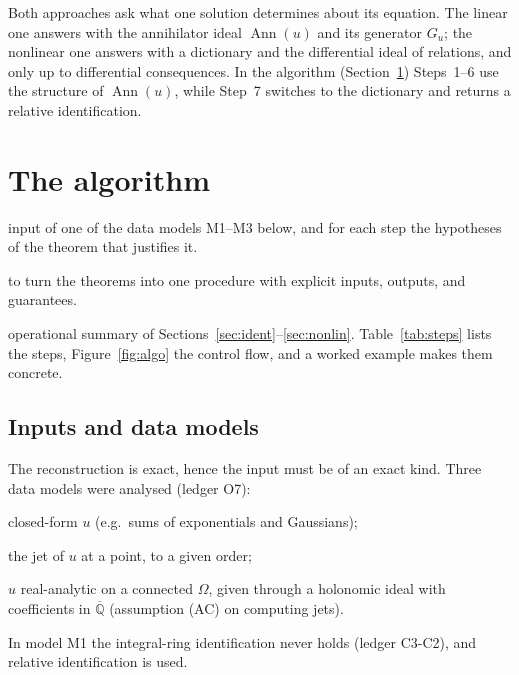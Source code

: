 \documentclass[11pt,a4paper]{article}
\theoremstyle{definition}
\newcommand{\led}[1]{\textcolor{cG}{\textsf{\footnotesize(ledger #1)}}}
\newcommand{\sectionbrief}[3]{\begin{leadin}\begin{description}[nosep,leftmargin=3.0cm,labelwidth=2.8cm]
  \item[Starting from] #1
  \item[Why this section] #2
  \item[Role in the paper] #3
  \end{description}\end{leadin}}
\newcommand{\Ann}{\operatorname{Ann}}
\begin{document}
\begin{keypoint}
Both approaches ask what one solution determines about its equation. The linear one answers with the annihilator ideal $\Ann(u)$ and its generator $G_u$; the nonlinear one answers with a dictionary and the differential ideal of relations, and only up to differential consequences. In the algorithm (Section~\ref{sec:algo}) Steps~1--6 use the structure of $\Ann(u)$, while Step~7 switches to the dictionary and returns a relative identification.
\end{keypoint}

\section{The algorithm}\label{sec:algo}
\sectionbrief
{input of one of the data models M1--M3 below, and for each step the hypotheses of the theorem that justifies it.}
{to turn the theorems into one procedure with explicit inputs, outputs, and guarantees.}
{operational summary of Sections~\ref{sec:ident}--\ref{sec:nonlin}. Table~\ref{tab:steps} lists the steps, Figure~\ref{fig:algo} the control flow, and a worked example makes them concrete.}

\subsection{Inputs and data models}
The reconstruction is exact, hence the input must be of an exact kind. Three data models were analysed \led{O7}:
\begin{description}[nosep,leftmargin=2.2cm,labelwidth=2cm]
\item[M1] closed-form $u$ (e.g.\ sums of exponentials and Gaussians);
\item[M2] the jet of $u$ at a point, to a given order;
\item[M3] $u$ real-analytic on a connected $\Omega$, given through a holonomic ideal with coefficients in $\overline{\mathbb Q}$ (assumption (AC) on computing jets).
\end{description}
In model M1 the integral-ring identification never holds \led{C3-C2}, and relative identification is used.
\end{document}
